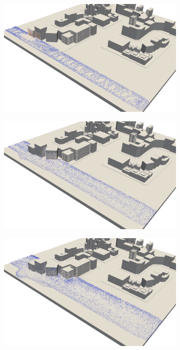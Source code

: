 \begin{figure}
  \begin{subfigure}{.5\textwidth}
    \centering
    \includegraphics[width=\textwidth]{figures/impulses-0.png}
  \end{subfigure}
  \begin{subfigure}{.5\textwidth}
    \centering
    \includegraphics[width=\textwidth]{figures/impulses-1.png}
  \end{subfigure}
  \begin{subfigure}{.5\textwidth}
    \centering
    \includegraphics[width=\textwidth]{figures/impulses-2.png}

\end{subfigure}
\end{figure}

